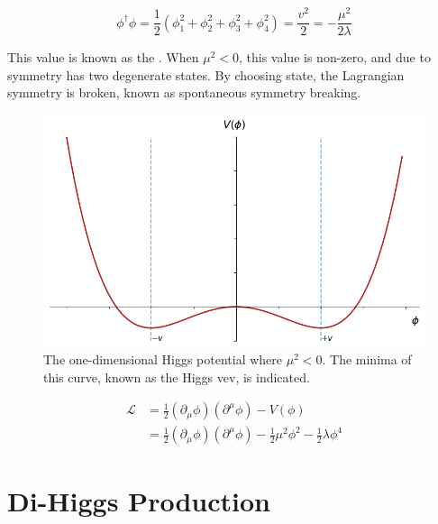 \begin{equation}
    \phi^\dagger \phi = \frac{1}{2}(\phi_{1}^{2}+\phi_{2}^{2}+\phi_{3}^{2}+\phi_{4}^{2}) = \frac{v^2}{2} = -\frac{\mu^2}{2\lambda}
\end{equation}

This value is known as the . When $\mu^2 < 0$, this value is non-zero, and due to symmetry has two degenerate states. By choosing state, the Lagrangian symmetry is broken, known as spontaneous symmetry breaking.

\begin{figure}[!ht]
    \centering
    \includegraphics[width=\textwidth]{chapters/chapter1_theory/images/higgs-2d-vev.png}
    \caption{The one-dimensional Higgs potential where $\mu^2 <0$. The minima of this curve, known as the Higgs \gls{vev}, is indicated.}
    \label{fig:higgs-potential}
\end{figure}


\begin{equation} \label{higgs-lagrangian}
    \begin{aligned}
        \mathcal{L} &= \frac{1}{2}(\partial_{\mu}\phi)(\partial^{\mu}\phi) - V(\phi)\\
        &= \frac{1}{2}(\partial_{\mu}\phi)(\partial^{\mu}\phi) - \frac{1}{2}\mu^2\phi^2 - \frac{1}{2}\lambda\phi^4
    \end{aligned}
\end{equation}



\section{Di-Higgs Production}


